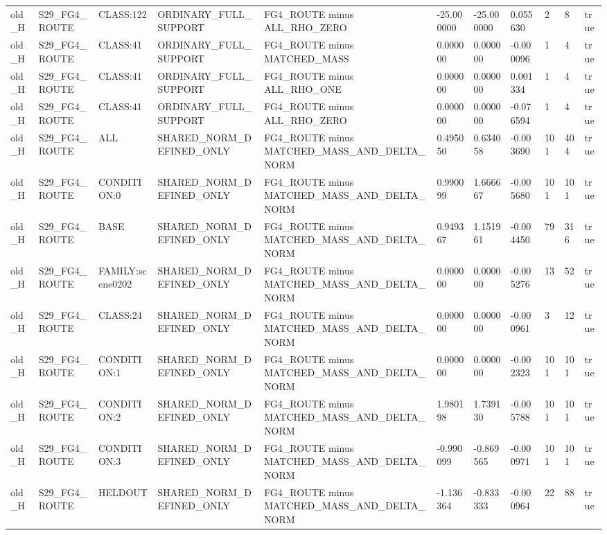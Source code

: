 \begin{tabular}{lllllllllll}
old\_H & S29\_FG4\_ROUTE & CLASS:122 & ORDINARY\_FULL\_SUPPORT & FG4\_ROUTE minus ALL\_RHO\_ZERO & -25.000000 & -25.000000 & 0.055630 & 2 & 8 & true \\
old\_H & S29\_FG4\_ROUTE & CLASS:41 & ORDINARY\_FULL\_SUPPORT & FG4\_ROUTE minus MATCHED\_MASS & 0.000000 & 0.000000 & -0.000096 & 1 & 4 & true \\
old\_H & S29\_FG4\_ROUTE & CLASS:41 & ORDINARY\_FULL\_SUPPORT & FG4\_ROUTE minus ALL\_RHO\_ONE & 0.000000 & 0.000000 & 0.001334 & 1 & 4 & true \\
old\_H & S29\_FG4\_ROUTE & CLASS:41 & ORDINARY\_FULL\_SUPPORT & FG4\_ROUTE minus ALL\_RHO\_ZERO & 0.000000 & 0.000000 & -0.076594 & 1 & 4 & true \\
old\_H & S29\_FG4\_ROUTE & ALL & SHARED\_NORM\_DEFINED\_ONLY & FG4\_ROUTE minus MATCHED\_MASS\_AND\_DELTA\_NORM & 0.495050 & 0.634058 & -0.003690 & 101 & 404 & true \\
old\_H & S29\_FG4\_ROUTE & CONDITION:0 & SHARED\_NORM\_DEFINED\_ONLY & FG4\_ROUTE minus MATCHED\_MASS\_AND\_DELTA\_NORM & 0.990099 & 1.666667 & -0.005680 & 101 & 101 & true \\
old\_H & S29\_FG4\_ROUTE & BASE & SHARED\_NORM\_DEFINED\_ONLY & FG4\_ROUTE minus MATCHED\_MASS\_AND\_DELTA\_NORM & 0.949367 & 1.151961 & -0.004450 & 79 & 316 & true \\
old\_H & S29\_FG4\_ROUTE & FAMILY:scene0202 & SHARED\_NORM\_DEFINED\_ONLY & FG4\_ROUTE minus MATCHED\_MASS\_AND\_DELTA\_NORM & 0.000000 & 0.000000 & -0.005276 & 13 & 52 & true \\
old\_H & S29\_FG4\_ROUTE & CLASS:24 & SHARED\_NORM\_DEFINED\_ONLY & FG4\_ROUTE minus MATCHED\_MASS\_AND\_DELTA\_NORM & 0.000000 & 0.000000 & -0.000961 & 3 & 12 & true \\
old\_H & S29\_FG4\_ROUTE & CONDITION:1 & SHARED\_NORM\_DEFINED\_ONLY & FG4\_ROUTE minus MATCHED\_MASS\_AND\_DELTA\_NORM & 0.000000 & 0.000000 & -0.002323 & 101 & 101 & true \\
old\_H & S29\_FG4\_ROUTE & CONDITION:2 & SHARED\_NORM\_DEFINED\_ONLY & FG4\_ROUTE minus MATCHED\_MASS\_AND\_DELTA\_NORM & 1.980198 & 1.739130 & -0.005788 & 101 & 101 & true \\
old\_H & S29\_FG4\_ROUTE & CONDITION:3 & SHARED\_NORM\_DEFINED\_ONLY & FG4\_ROUTE minus MATCHED\_MASS\_AND\_DELTA\_NORM & -0.990099 & -0.869565 & -0.000971 & 101 & 101 & true \\
old\_H & S29\_FG4\_ROUTE & HELDOUT & SHARED\_NORM\_DEFINED\_ONLY & FG4\_ROUTE minus MATCHED\_MASS\_AND\_DELTA\_NORM & -1.136364 & -0.833333 & -0.000964 & 22 & 88 & true \\

\end{tabular}
